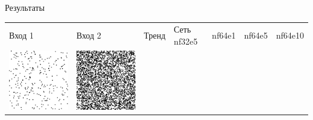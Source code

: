 \documentclass[12pt]{beamer}
\begin{document}
	\begin{frame}{Результаты}
		\begin{table}
			\begin{center}
				\begin{tabular}{p{1.2cm} p{1.2cm} p{1.2cm} p{1.2cm} p{1.2cm} p{1.2cm} p{1.2cm}}
					\toprule
					Вход 1 & Вход 2 & Тренд & Сеть nf32e5 & nf64e1 & nf64e5 & nf64e10 \\
					\cmidrule(r){1-1}\cmidrule(lr){2-2}\cmidrule(lr){3-3}\cmidrule(lr){4-4}\cmidrule(lr){5-5}\cmidrule(lr){6-6}\cmidrule(l){7-7}
					\includegraphics[width=1\linewidth]{8-results/sand-trend8/left1}
					&
					\includegraphics[width=1\linewidth]{8-results/sand-trend8/right1}

\end{tabular}
\end{center}
\end{table}
\end{frame}
\end{document}
